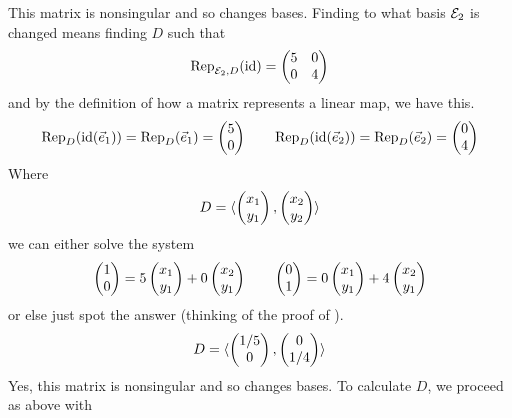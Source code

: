 \begin{exercises}
\begin{answer}
       \begin{exparts}
        \partsitem This matrix is nonsingular and so changes bases.
          Finding to what basis \( \stdbasis_2 \) is changed 
          means finding $D$ such that 
          \begin{equation*}
            \rep{\identity}{\stdbasis_2,D}=
            \begin{pmatrix}
                 5  &0  \\
                 0  &4
            \end{pmatrix}
          \end{equation*}
          and by the definition of how a matrix represents a linear map,
          we have this.
          \begin{equation*}
            \rep{\identity(\vec{e}_1)}{D}=\rep{\vec{e}_1}{D}=\colvec{5 \\ 0}
            \qquad
            \rep{\identity(\vec{e}_2)}{D}=\rep{\vec{e}_2}{D}=\colvec{0 \\ 4}
          \end{equation*}
          Where
          \begin{equation*}
            D=\sequence{\colvec{x_1 \\ y_1},\colvec{x_2 \\ y_2}}
          \end{equation*}
          we can either solve the system
          \begin{equation*}
            \colvec{1 \\ 0}
            =5\colvec{x_1 \\ y_1}+0\colvec{x_2 \\ y_1}
            \qquad
            \colvec{0 \\ 1}
            =0\colvec{x_1 \\ y_1}+4\colvec{x_2 \\ y_1}
          \end{equation*}
          or else just spot the answer
          (thinking of the proof of ).
          \begin{equation*}
            D=\sequence{\colvec{1/5 \\ 0},
                        \colvec{0 \\ 1/4}}
          \end{equation*}
        \partsitem Yes, this matrix is nonsingular and so changes bases.
          To calculate $D$, we proceed as above with 
          \begin{equation*}

\end{equation*}
\end{exparts}
\end{answer}
\end{exercises}
